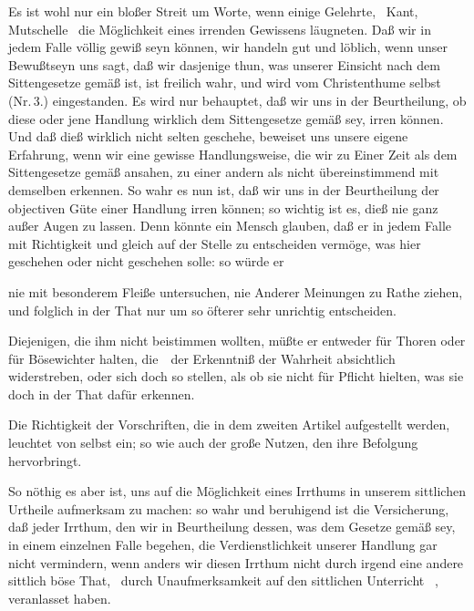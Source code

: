 \begin{aufza}
\item Es ist wohl nur ein bloßer Streit um Worte, wenn einige Gelehrte, \zB\  Kant, Mutschelle \uA\ die Möglichkeit eines irrenden Gewissens läugneten. Daß wir in jedem Falle völlig gewiß seyn können, wir handeln gut und löblich, wenn unser Bewußtseyn uns sagt, daß wir dasjenige thun, was unserer Einsicht nach dem Sittengesetze gemäß ist, ist freilich wahr, und wird vom Christenthume selbst (Nr.\,3.) eingestanden. Es wird nur behauptet, daß wir uns in der Beurtheilung, ob diese oder jene Handlung wirklich dem Sittengesetze gemäß sey, irren können. Und daß dieß wirklich nicht selten geschehe, beweiset uns unsere eigene Erfahrung, wenn wir eine gewisse Handlungsweise, die wir zu Einer Zeit als dem Sittengesetze gemäß ansahen, zu einer andern als nicht übereinstimmend mit demselben erkennen. So wahr es nun ist, daß wir uns in der Beurtheilung der objectiven Güte einer Handlung irren können; so wichtig ist es, dieß nie ganz außer Augen zu lassen. Denn könnte ein Mensch glauben, daß er in jedem Falle mit Richtigkeit und gleich auf der Stelle zu entscheiden vermöge, was hier geschehen oder nicht geschehen solle: so würde er
\begin{aufzb}
\item nie mit besonderem Fleiße untersuchen, nie Anderer Meinungen zu Rathe ziehen, und folglich in der That nur um so öfterer sehr unrichtig entscheiden.
\item Diejenigen, die ihm nicht beistimmen wollten, müßte er entweder für Thoren oder für Bösewichter halten, die~\ der Erkenntniß der Wahrheit absichtlich widerstreben, oder sich doch so stellen, als ob sie nicht für Pflicht hielten, was sie doch in der That dafür erkennen.
\end{aufzb}
\item Die Richtigkeit der Vorschriften, die in dem zweiten Artikel aufgestellt werden, leuchtet von selbst ein; so wie auch der große Nutzen, den ihre Befolgung hervorbringt.
\item So nöthig es aber ist, uns auf die Möglichkeit eines Irrthums in unserem sittlichen Urtheile aufmerksam zu machen: so wahr und beruhigend ist die Versicherung, daß jeder Irrthum, den wir in Beurtheilung dessen, was dem Gesetze gemäß sey, in einem einzelnen Falle begehen, die Verdienstlichkeit unserer Handlung gar nicht vermindern, wenn anders wir diesen Irrthum nicht durch irgend eine andere sittlich böse That, \zB\  durch Unaufmerksamkeit auf den sittlichen Unterricht \udgl\ , veranlasset haben.

\end{aufza}
